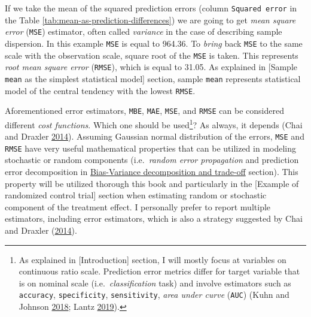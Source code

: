 \documentclass[
]{book}
\begin{document}
If we take the mean of the squared prediction errors (column \texttt{Squared\ error} in the Table \ref{tab:mean-as-prediction-differences}) we are going to get \emph{mean square error} (\texttt{MSE}) estimator, often called \emph{variance} in the case of describing sample dispersion. In this example \texttt{MSE} is equal to 964.36. To \emph{bring} back \texttt{MSE} to the same scale with the observation scale, square root of the \texttt{MSE} is taken. This represents \emph{root mean square error} (\texttt{RMSE}), which is equal to 31.05. As explained in {[}Sample \texttt{mean} as the simplest statistical model{]} section, sample \texttt{mean} represents statistical model of the central tendency with the lowest \texttt{RMSE}.

Aforementioned error estimators, \texttt{MBE}, \texttt{MAE}, \texttt{MSE}, and \texttt{RMSE} can be considered different \emph{cost functions}. Which one should be used\footnote{As explained in {[}Introduction{]} section, I will mostly focus at variables on continuous ratio scale. Prediction error metrics differ for target variable that is on nominal scale (i.e.~\emph{classification} task) and involve estimators such as \texttt{accuracy}, \texttt{specificity}, \texttt{sensitivity}, \emph{area under curve} (\texttt{AUC}) (Kuhn and Johnson \protect\hyperlink{ref-kuhnAppliedPredictiveModeling2018}{2018}; Lantz \protect\hyperlink{ref-lantzMachineLearningExpert2019}{2019}).}? As always, it depends (Chai and Draxler \protect\hyperlink{ref-chaiRootMeanSquare2014}{2014}). Assuming Gaussian normal distribution of the errors, \texttt{MSE} and \texttt{RMSE} have very useful mathematical properties that can be utilized in modeling stochastic or random components (i.e.~\emph{random error propagation} and prediction error decomposition in \protect\hyperlink{bias-variance-decomposition-and-trade-off}{Bias-Variance decomposition and trade-off} section). This property will be utilized thorough this book and particularly in the {[}Example of randomized control trial{]} section when estimating random or stochastic component of the treatment effect. I personally prefer to report multiple estimators, including error estimators, which is also a strategy suggested by Chai and Draxler (\protect\hyperlink{ref-chaiRootMeanSquare2014}{2014}).
\end{document}

